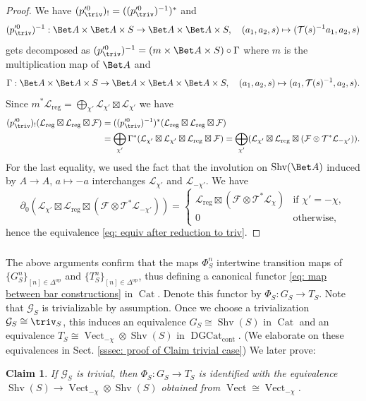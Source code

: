 \documentclass[10pt]{amsart}
\newcommand{\sssec}{\subsubsection}
\newtheorem{claim}[subsubsection]{Claim}
\theoremstyle{remark}
\newcommand{\te}{\text}
\newcommand{\pa}{\partial}
\newcommand{\on}{\operatorname}
\newcommand{\cF}{\mathcal{F}}
\newcommand{\cG}{\mathcal{G}}
\newcommand{\cL}{\mathcal{L}}
\newcommand{\cT}{\mathcal{T}}
\newcommand{\Cat}{\on{Cat}}
\newcommand{\DGcat}{\on{DGCat}_{\on{cont}}}
\newcommand{\Vect}{\on{Vect}}
\newcommand{\Shv}{\on{Shv}}
\DeclareMathOperator{\op}{op}
\begin{document}
\begin{proof}
We have $(p'^0_{\triv})_!=((p'^0_{\triv})^{-1})^*$ and 
\[(p'^0_{\triv})^{-1}: \Bet A\times\Bet A\times S\rightarrow \Bet A\times\Bet A\times S,\quad (a_1,a_2,s)\mapsto (\cT(s)^{-1}a_1,a_2,s)\]
gets decomposed as
$(p'^0_{\triv})^{-1}=(m\times \Bet A\times S)\circ \Gamma$
where $m$ is the multiplication map of $\Bet A$ and
\[\Gamma: \Bet A\times\Bet A\times S\rightarrow \Bet A\times\Bet A\times\Bet A\times S,\quad (a_1,a_2,s)\mapsto (a_1, \cT(s)^{-1},a_2,s).\]
Since $m^*\cL_{\on{reg}}=\bigoplus_{\chi'} \cL_{\chi'}\boxtimes \cL_{\chi'}$ we have 
\begin{align*}
    (p'^0_{\triv})_!(\cL_{\on{reg}}\boxtimes \cL_{\on{reg}}\boxtimes \cF) &= ((p'^0_{\triv})^{-1})^* (\cL_{\on{reg}}\boxtimes \cL_{\on{reg}}\boxtimes \cF) \\
    &  
    =\bigoplus_{\chi'} \Gamma^*(\cL_{\chi'}\boxtimes\cL_{\chi'}\boxtimes \cL_{\on{reg}}\boxtimes\cF)= \bigoplus_{\chi'}(\cL_{\chi'}\boxtimes \cL_{\on{reg}}\boxtimes (\cF\otimes\cT^{*}\cL_{-\chi'})).
\end{align*}
For the last equality, we used the fact that the involution on $\Shv(\Bet A)$ induced by $A\rightarrow A$, $a\mapsto -a$ interchanges $\cL_{\chi'}$ and $\cL_{-\chi'}$.
We have
\[\pa_0(\cL_{\chi'}\boxtimes \cL_{\on{reg}}\boxtimes (\cF\otimes\cT^{*}\cL_{-\chi'}))=\begin{cases}
    \cL_{\on{reg}}\boxtimes (\cF\otimes\cT^{*}\cL_{\chi}) &\te{if } \chi'=-\chi,\\
    0 &\te{otherwise,}
\end{cases}\]
hence the equivalence \eqref{eq: equiv after reduction to triv}.
\end{proof}



\sssec{}\label{sssec: showing equiv btw bar constructions}
The above arguments confirm that the maps $\Phi^n_S$ intertwine transition maps of $\{G^n_S\}_{[n]\in\Delta^{\op}}$ and $\{T^n_S\}_{[n]\in\Delta^{\op}}$, thus defining a canonical functor \eqref{eq: map between bar constructions} in $\Cat$. Denote this functor by $\Phi_S:G_S\rightarrow T_S$. Note that $\cG_S$ is trivializable by assumption. Once we choose a trivialization $\cG_S\cong \triv_S$, this induces an equivalence $G_S\cong \Shv(S)$ in $\Cat$ and an equivalence $T_S\cong \Vect_{-\chi}\otimes\Shv(S)$ in $\DGcat$. (We elaborate on these equivalences in Sect. \ref{sssec: proof of Claim trivial case}) We later prove:
\begin{claim}\label{claim: Phi n in the trivial case}
    If $\cG_S$ is trivial, then $\Phi_S:G_S\rightarrow T_S$ is identified with the equivalence $\Shv(S)\rightarrow \Vect_{-\chi}\otimes\Shv(S)$ obtained from $\Vect\cong \Vect_{-\chi}$.
\end{claim}
\end{document}
